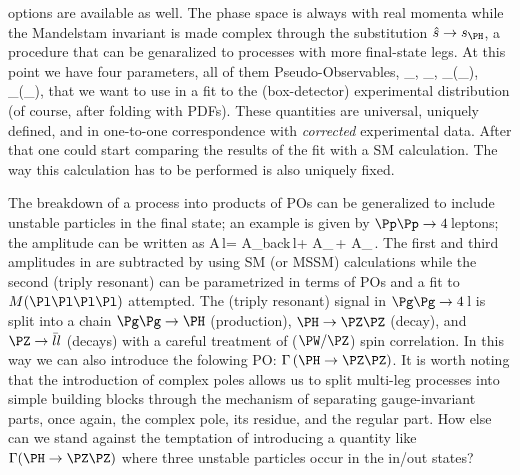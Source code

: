 options are available as well. The phase space is always with real momenta
while the Mandelstam invariant is made complex through the substitution
${\hat s} \to s_{\PH}$, a procedure that can be genaralized to processes with
more final-state legs. At this point we have four parameters, all of them 
Pseudo-Observables,
\bq
\mu_{\PH}, \quad \gamma_{\PH}, \quad \sigma_{\Pg\Pg \to \PH}(\mu_{\PH}), \quad
\Gamma_{\PH \to \PGg\PGg}(\mu_{\PH}),
\eq
that we want to use in a fit to the (box-detector) experimental distribution
(of course, after folding with PDFs). These quantities are universal, 
uniquely defined, and in one-to-one correspondence with {\em corrected}
experimental data. After that one could start comparing the results of the fit
with a SM calculation. The way this calculation has to be performed is also
uniquely fixed.

The breakdown of a process into products of POs can be generalized to include 
unstable particles in the final state; an example is given by 
$\Pp\Pp \to 4\,$leptons; the amplitude can be written as
\bq
A\lpar \Pp\Pp {}\,{\rm l}\rpar =
A_{\rm back}\lpar \Pp\Pp {}\,{\rm l}\rpar +
A_{\PH}\lpar \Pp\Pp \to \PH \to \PZ\PZ {}\,\Pl\rpar +
A_{\PH}\lpar \Pp\Pp \to \PH {}\,\Pl\rpar.
\label{split}
\eq
The first and third amplitudes in  are subtracted by using SM 
(or MSSM) calculations while the second (triply resonant) can be parametrized 
in terms of POs and a fit to $M(\Pl\Pl\Pl\Pl)$ attempted. The (triply resonant) 
signal in $\Pg \Pg \to 4\,$l is split into a chain 
$\Pg\Pg \to \PH$ (production), 
$\PH \to \PZ\PZ$ (decay), and $\PZ \to {\bar l} l$ (decays) with a 
careful treatment of ($\PW/\PZ$) spin correlation. 
In this way we can also introduce the folowing PO: $\Gamma\lpar \PH \to \PZ\PZ\rpar$. 
It is worth noting that the introduction of complex poles allows us to split 
multi-leg processes into simple building blocks through the mechanism of
separating gauge-invariant parts, once again, the complex pole, its residue,
and the regular part.
How else can we stand against the temptation of introducing a quantity like 
$\Gamma(\PH \to \PZ\PZ)$ where three unstable particles occur in the in/out
states? 


